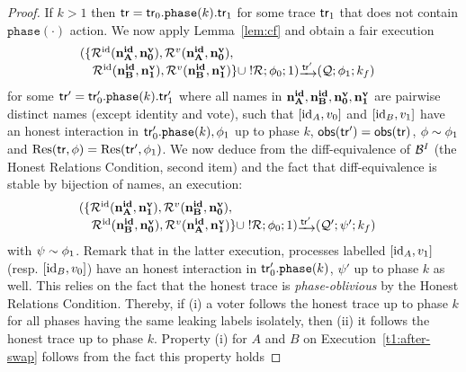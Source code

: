 \begin{proof}
If $k>1$ then $\mathsf{tr}=\mathsf{tr}_0.\mathtt{phase}(k).\mathsf{tr}_1$ for some
trace $\mathsf{tr}_1$ that does not contain $\mathtt{phase}(\cdot)$ action.
We now apply Lemma~\ref{lem:cf} and obtain a fair execution
\begin{equation}
\begin{array}{ll}
(\{
\roles^\id(\nID{A},\nV{0}),
\roles^v(\nID{A},\nV{0}),&\\
\ \ \ \roles^\id(\nID{B},\nV{1}),
\roles^v(\nID{B},\nV{1})
\}\cup\;!\roles;
\phi_0;1)
\sint{\tr'}
(\q;\phi_1;k_f)
\end{array}
\label{t1:before-swap}
\end{equation}
for some $\mathsf{tr}'=\mathsf{tr}_0'.\mathtt{phase}(k).\mathsf{tr}_1'$
where all names in ${\mathbf{n^{id}_{A}}},{\mathbf{n^{id}_{B}}},{\mathbf{n^{v}_{0}}},{\mathbf{n^{v}_{1}}}$ are pairwise distinct names (except identity and vote),
such that $[\mathrm{id}_A,v_0]$ and $[\mathrm{id}_B,v_1]$ have an honest interaction in
$\mathsf{tr}_0'.\mathtt{phase}(k), \phi_1$ up to phase $k$,
$\mathsf{obs}(\mathsf{tr}')=\mathsf{obs}(\mathsf{tr})$, $\phi\sim\phi_1$
and $\mathrm{Res}(\mathsf{tr},\phi)=\mathrm{Res}(\mathsf{tr}',\phi_1)$.
We now deduce from 
the diff-equivalence of $\mathcal{B}^I$
(\ie the Honest Relations Condition, second item)
and the fact that diff-equivalence is stable by bijection of names,
an execution:
\begin{equation}
\begin{array}{ll}
(\{
\roles^\id(\nID{A},\nV{1}),
\roles^v(\nID{B},\nV{0}),&\\
\ \ \ \roles^\id(\nID{B},\nV{0}),
\roles^v(\nID{A},\nV{1})
\}\cup\;!\roles;
\phi_0;1)
\sint{\tr'}
(\q';\psi';k_f)
\end{array}
\label{t1:after-swap}
\end{equation}
with $\psi\sim\phi_1$.
Remark that in the latter execution,
processes labelled $[\mathrm{id}_A,v_1]$ (resp. $[\mathrm{id}_B,v_0]$) have an honest
interaction in $\mathsf{tr}_0'.\mathtt{phase}(k)$, $\psi'$ up to phase $k$ as well.
This relies on the fact that the honest trace is {\em phase-oblivious}
by the Honest Relations Condition.
Thereby, if
(i) a voter follows the honest trace up to phase $k$ for all phases having the same leaking labels isolately, then
(ii) it follows the honest trace up to phase $k$. Property (i) for $A$ and $B$
on Execution~\ref{t1:after-swap} follows from the fact this property holds

\end{proof}
